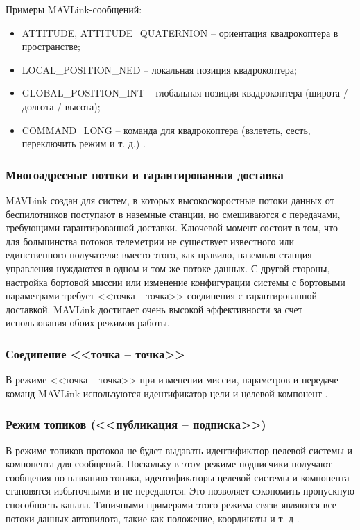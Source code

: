 Примеры MAV\-Link-сообщений:
\begin{itemize}
\item ATTITUDE, ATTITUDE\_QUATERNION – ориентация квадрокоптера в пространстве;
\item LOCAL\_POSITION\_NED – локальная позиция квадрокоптера;
\item GLOBAL\_POSITION\_INT – глобальная позиция квадрокоптера (широта / долгота / высота);
\item COMMAND\_LONG – команда для квадрокоптера (взлететь, сесть, переключить режим и т. д.) \cite{clover}.
\end{itemize}

\subsubsection{Многоадресные потоки и гарантированная доставка}
MAVLink создан для систем, в которых высокоскоростные потоки данных от беспилотников поступают в наземные станции, но смешиваются с передачами, требующими гарантированной доставки. Ключевой момент состоит в том, что для большинства потоков телеметрии не существует известного или единственного получателя: вместо этого, как правило, наземная станция управления нуждаются в одном и том же потоке данных.
С другой стороны, настройка бортовой миссии или изменение конфигурации системы с бортовыми параметрами требует <<точка -- точка>> соединения с гарантированной доставкой. MAVLink достигает очень высокой эффективности за счет использования обоих режимов работы.

\subsubsection{Соединение <<точка -- точка>>}
В режиме <<точка -- точка>> при изменении миссии, параметров и передаче команд MAV\-Link используются идентификатор цели и целевой компонент \cite{mavlink}.

\subsubsection{Режим топиков (<<публикация -- подписка>>)}
В режиме топиков протокол не будет выдавать идентификатор целевой системы и компонента для сообщений. Поскольку в этом режиме подписчики получают сообщения по названию топика, идентификаторы целевой системы и компонента становятся избыточными и не передаются. Это позволяет сэкономить пропускную способность канала. Типичными примерами этого режима связи являются все потоки данных автопилота, такие как положение, координаты и т. д \cite{mavlink}.

